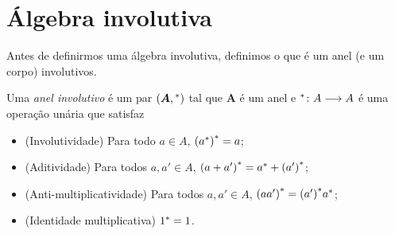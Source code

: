 \section{Álgebra involutiva}

Antes de definirmos uma álgebra involutiva, definimos o que é um anel (e um corpo) involutivos.

\begin{definition}
Uma \emph{anel involutivo} é um par $(\bm A,{}^{\ast})$ tal que $\bm A$ é um anel e ${{}^{\ast}}\colon {A} \longrightarrow {A}$ é uma operação unária que satisfaz
	\begin{itemize}
	\item (Involutividade) Para todo $a \in A$, ${({a}^{\ast})}^{\ast} = a$;
	\item (Aditividade) Para todos $a,a' \in A$, ${(a+a')}^{\ast} = {a}^{\ast} + {(a')}^{\ast}$;
	\item (Anti-multiplicatividade) Para todos $a,a' \in A$, ${(aa')}^{\ast} = {(a')}^{\ast}{a}^{\ast}$;
	\item (Identidade multiplicativa) ${1}^{\ast} = 1$.
	\end{itemize}
\end{definition}

